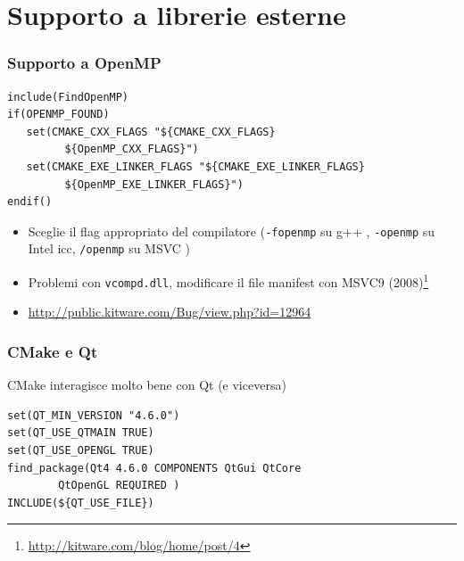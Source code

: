 \documentclass[10pt] {beamer}
\begin{document}
\section{Supporto a librerie esterne}
\begin{frame}[fragile]
 \frametitle{Supporto a OpenMP}
\begin{footnotesize}
\begin{verbatim}
include(FindOpenMP)
if(OPENMP_FOUND)
   set(CMAKE_CXX_FLAGS "${CMAKE_CXX_FLAGS} 
         ${OpenMP_CXX_FLAGS}")
   set(CMAKE_EXE_LINKER_FLAGS "${CMAKE_EXE_LINKER_FLAGS} 
         ${OpenMP_EXE_LINKER_FLAGS}")
endif()
\end{verbatim}
\end{footnotesize}
\begin{itemize}
 \item Sceglie il flag appropriato del compilatore (\texttt{-fopenmp} su g++ , \texttt{-openmp} su Intel icc, \texttt{/openmp} su MSVC )
 \item Problemi con \texttt{vcompd.dll}, modificare il file manifest con MSVC9 (2008)\footnote{\url{http://kitware.com/blog/home/post/4}}
\item \url{http://public.kitware.com/Bug/view.php?id=12964}
\end{itemize}

\end{frame}


\begin{frame}[fragile]
\frametitle{CMake e Qt}
CMake interagisce molto bene con Qt (e viceversa)
\begin{footnotesize}
\begin{verbatim}
set(QT_MIN_VERSION "4.6.0")
set(QT_USE_QTMAIN TRUE)
set(QT_USE_OPENGL TRUE)
find_package(Qt4 4.6.0 COMPONENTS QtGui QtCore 
	    QtOpenGL REQUIRED )
INCLUDE(${QT_USE_FILE})
\end{verbatim}
\end{footnotesize}
\end{frame}

\end{document}
